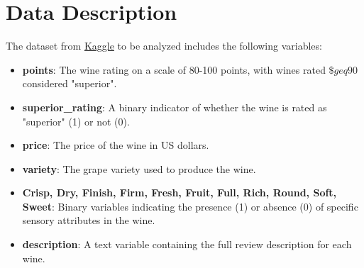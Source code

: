\documentclass{article}
\begin{document}
\section{Data Description}\label{sec:data}
The dataset from \href{https://www.kaggle.com/datasets/zynicide/wine-reviews}{Kaggle} to be analyzed includes the following variables:

\begin{itemize}
    \item \textbf{points}: The wine rating on a scale of 80-100 points, with wines rated $\$geq 90$ considered "superior".
    \item \textbf{superior\_rating}: A binary indicator of whether the wine is rated as "superior" (1) or not (0).
    \item \textbf{price}: The price of the wine in US dollars.
    \item \textbf{variety}: The grape variety used to produce the wine.
    \item \textbf{Crisp, Dry, Finish, Firm, Fresh, Fruit, Full, Rich, Round, Soft, Sweet}: Binary variables indicating the presence (1) or absence (0) of specific sensory attributes in the wine.
    \item \textbf{description}: A text variable containing the full review description for each wine.
\end{itemize}
\end{document}
